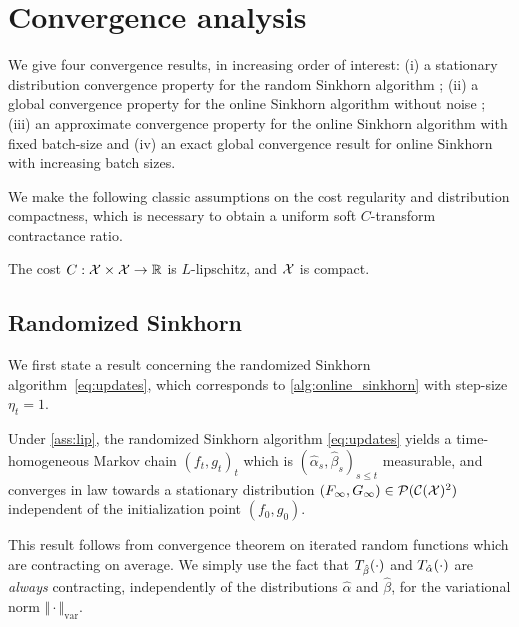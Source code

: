 

\section{Convergence analysis}\label{sec:analysis}

We give four convergence results, in increasing order of interest: (i) a stationary distribution
convergence property for the random Sinkhorn algorithm ; (ii) a global
convergence property for the online Sinkhorn algorithm without noise ; (iii) an
approximate convergence property for the online Sinkhorn algorithm with fixed
batch-size and (iv) an exact global convergence result for online Sinkhorn
with increasing batch sizes.

We make the following classic assumptions on the cost regularity and
distribution compactness, which is necessary to obtain a uniform
soft $C$-transform contractance ratio.

\begin{assumption}\label{ass:lip}
    The cost $C: \mathcal{X} \times \mathcal{X} \to \mathbb{R}$ is $L$-lipschitz, and $\mathcal{X}$ is  compact.
\end{assumption}

\subsection{Randomized Sinkhorn}

We first state a result concerning the randomized Sinkhorn algorithm~\eqref{eq:updates}, which corresponds to
\autoref{alg:online_sinkhorn} with step-size $\eta_t = 1$.

\begin{proposition}\label{prop:markov}
    Under \autoref{ass:lip}, the randomized Sinkhorn algorithm \eqref{eq:updates} yields a time-homogeneous
    Markov chain ${(f_t, g_t)}_t$ which is $(\hat \alpha_s, \hat \beta_s)_{s \leq
    t}$ measurable, and converges in law towards a stationary distribution
    $(F_\infty, G_\infty) \in \mathcal{P}(\mathcal{C}(\mathcal{X})^2)$ independent of the initialization
    point $(f_0, g_0)$.
\end{proposition}

This result follows from \citet{diaconis_iterated} convergence theorem on
iterated random functions which are contracting on average. We simply use the
fact that $T_{\hat \beta}(\cdot)$ and $T_{\hat \alpha}(\cdot)$ are
\textit{always} contracting, independently of the distributions $\hat \alpha$ and
$\hat \beta$, for the variational norm $\Vert \cdot \Vert_{\text{var}}$.

